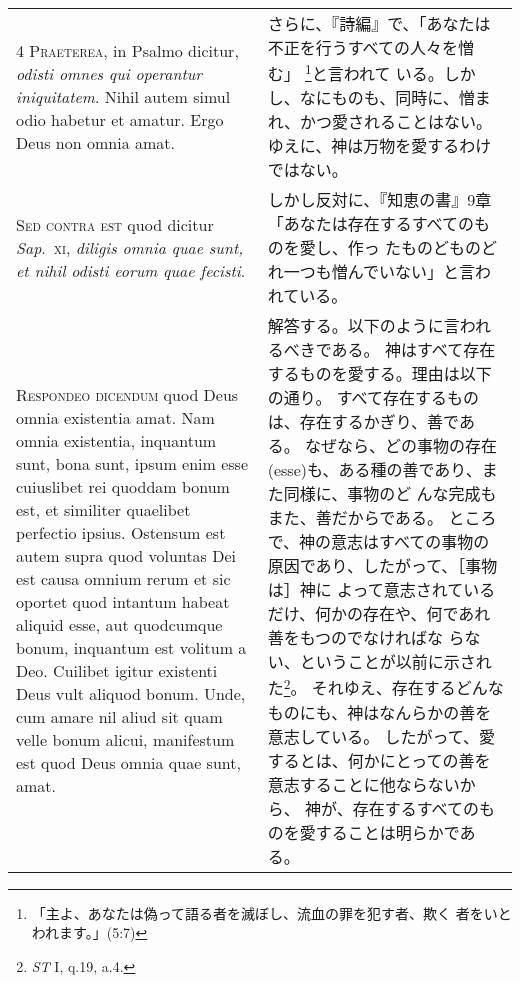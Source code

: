 \documentclass[10pt]{jsarticle} %
\begin{document}
\begin{longtable}{p{21em}p{21em}}
\\


{\scshape 4 Praeterea}, in Psalmo dicitur, {\itshape odisti omnes
qui operantur iniquitatem}. Nihil autem simul odio habetur et
amatur. Ergo Deus non omnia amat.


&

さらに、『詩編』で、「あなたは不正を行うすべての人々を憎む」
 \footnote{「主よ、あなたは偽って語る者を滅ぼし、流血の罪を犯す者、欺く
 者をいとわれます。」(5:7)}と言われて
 いる。しかし、なにものも、同時に、憎まれ、かつ愛されることはない。
ゆえに、神は万物を愛するわけではない。

\\


{\scshape Sed contra est} quod dicitur {\itshape Sap}.~{\scshape xi}, {\itshape diligis
omnia quae sunt, et nihil odisti eorum quae fecisti}.


&

しかし反対に、『知恵の書』9章「あなたは存在するすべてのものを愛し、作っ
 たものどものどれ一つも憎んでいない」と言われている。

\\


{\scshape Respondeo dicendum} quod Deus omnia existentia
amat. Nam omnia existentia, inquantum sunt, bona sunt, ipsum enim esse
cuiuslibet rei quoddam bonum est, et similiter quaelibet perfectio
ipsius. Ostensum est autem supra quod voluntas Dei est causa omnium
rerum et sic oportet quod intantum habeat aliquid esse, aut quodcumque
bonum, inquantum est volitum a Deo. Cuilibet igitur existenti Deus vult
aliquod bonum. Unde, cum amare nil aliud sit quam velle bonum alicui,
manifestum est quod Deus omnia quae sunt, amat. 



&

解答する。以下のように言われるべきである。
神はすべて存在するものを愛する。理由は以下の通り。
すべて存在するものは、存在するかぎり、善である。
なぜなら、どの事物の存在(esse)も、ある種の善であり、また同様に、事物のど
 んな完成もまた、善だからである。
ところで、神の意志はすべての事物の原因であり、したがって、［事物は］神に
 よって意志されているだけ、何かの存在や、何であれ善をもつのでなければな
 らない、ということが以前に示された\footnote{{\itshape ST} I, q.19, a.4.}。
それゆえ、存在するどんなものにも、神はなんらかの善を意志している。
したがって、愛するとは、何かにとっての善を意志することに他ならないから、
 神が、存在するすべてのものを愛することは明らかである。


\\




\end{longtable}
\end{document}
